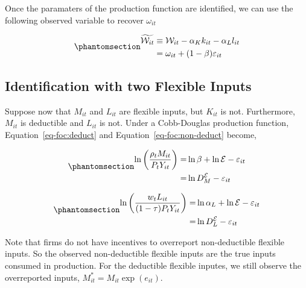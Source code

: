 \documentclass[
  12pt]{article}
\theoremstyle{definition}
\theoremstyle{remark}
\begin{document}
Once the paramaters of the production function are identified, we can
use the following observed variable to recover \(\omega_{it}\)

\begin{equation}\phantomsection\label{eq-w-squiggle}{
\begin{aligned}
    \widetilde{\mathcal W_{it}} & \equiv \mathcal W_{it} - \alpha_K k_{it}-\alpha_L l_{it}\\
    & = \omega_{it}+(1-\beta)\varepsilon_{it}
\end{aligned}
}\end{equation}

\subsection{Identification with two Flexible
Inputs}\label{identification-with-two-flexible-inputs}

Suppose now that \(M_{it}\) and \(L_{it}\) are flexible inputs, but
\(K_{it}\) is not. Furthermore, \(M_{it}\) is deductible and \(L_{it}\)
is not. Under a Cobb-Douglas production function,
Equation~\ref{eq-foc:deduct} and Equation~\ref{eq-foc:non-deduct}
become,

\begin{equation}\phantomsection\label{eq-fs-ded}{
\begin{aligned}    
 \ln\left(\frac{\rho_t M_{it}}{P_t Y_{it}}\right)=&\ln \beta +\ln \mathcal{E} -\varepsilon_{it} \\
 =& \ln D^{\mathcal{E}}_M - \varepsilon_{it} \\
\end{aligned}
}\end{equation}

\begin{equation}\phantomsection\label{eq-fs-non-ded}{
\begin{aligned}
    \ln\left(\frac{w_t L_{it}}{(1-\tau)P_t Y_{it}}\right)=&\ln \alpha_L +\ln \mathcal{E} -\varepsilon_{it} \\
    =& \ln D^{\mathcal{E}}_L - \varepsilon_{it}
\end{aligned}
}\end{equation}

Note that firms do not have incentives to overreport non-deductible
flexible inputs. So the observed non-deductible flexible inputs are the
true inputs consumed in production. For the deductible flexible inputes,
we still observe the overreported inputs,
\(M^*_{it}=M_{it}\exp(e_{it})\).
\end{document}
